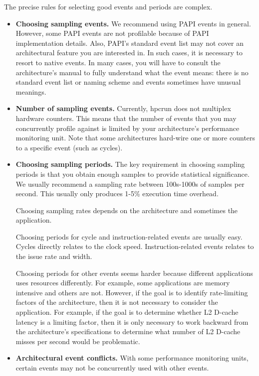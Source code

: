 \documentclass[english]{article}
\begin{document}
The precise rules for selecting good events and periods are complex.
\begin{itemize}

\item \textbf{Choosing sampling events.}
We recommend using PAPI events in general.
However, some PAPI events are not profilable because of PAPI implementation details.
Also, PAPI's standard event list may not cover an architectural feature you are interested in.
In such cases, it is necessary to resort to native events.
In many cases, you will have to consult the architecture's manual to fully understand what the event means: there is no standard event list or naming scheme and events sometimes have unusual meanings.

\item \textbf{Number of sampling events.}
Currently, hpcrun does not multiplex hardware counters.
This means that the number of events that you may concurrently profile against is limited by your architecture's performance monitoring unit.
Note that some architectures hard-wire one or more counters to a specific event (such as cycles).

\item \textbf{Choosing sampling periods.}
The key requirement in choosing sampling periods is that you obtain enough samples to provide statistical significance.
We usually recommend a sampling rate between 100s-1000s of samples per second.
This usually only produces 1-5\% execution time overhead.

Choosing sampling rates depends on the architecture and sometimes the application.

Choosing periods for cycle and instruction-related events are usually easy.
Cycles directly relates to the clock speed.
Instruction-related events relates to the issue rate and width.

Choosing periods for other events seems harder because different applications uses resources differently.
For example, some applications are memory intensive and others are not.
However, if the goal is to identify rate-limiting factors of the architecture, then it is not necessary to consider the application.
For example, if the goal is to determine whether L2 D-cache latency is a limiting factor, then it is only necessary to work backward from the architecture's specifications to determine what number of L2 D-cache misses per second would be problematic.

\item \textbf{Architectural event conflicts.}
With some performance monitoring units, certain events may not be concurrently used with other events.


\end{itemize}
\end{document}
